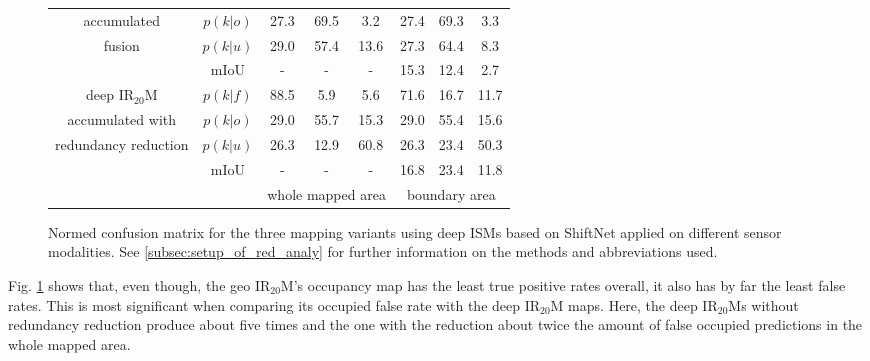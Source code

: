 \begin{figure}[H]
\begin{center}
\begin{tabular}{c|c|ccc|ccc}
			accumulated &$p(k|o)$ & \textcolor{myred}{27.3} & \textcolor{mygreen}{69.5} & 3.2& \textcolor{myred}{27.4} & \textcolor{mygreen}{69.3} & 3.3 \\
			fusion&$p(k|u)$ & 29.0 & 57.4 & 13.6& 27.3 & 64.4 & 8.3 \\
			& mIoU & - & - & - &15.3&12.4&2.7 \\
			\hline
			deep IR$_{20}$M &$p(k|f)$ & \textcolor{mygreen}{88.5} & \textcolor{myred}{5.9} & 5.6& \textcolor{mygreen}{71.6} & \textcolor{myred}{16.7} & 11.7 \\
			accumulated with &$p(k|o)$ & \textcolor{myred}{29.0} & \textcolor{mygreen}{55.7} & 15.3& \textcolor{myred}{29.0} & \textcolor{mygreen}{55.4} & 15.6 \\
			redundancy reduction &$p(k|u)$ & 26.3 & 12.9 & 60.8& 26.3 & 23.4 & 50.3 \\
			& mIoU & - & - & - &16.8&23.4&11.8 \\
			\hline
			& & \multicolumn{3}{c|}{\scriptsize{whole mapped area}} & \multicolumn{3}{c}{\scriptsize{boundary area}}
		\end{tabular}
		\caption{\label{tab:conf_mat_redunt_info}Normed confusion matrix for the three mapping variants using deep ISMs based on ShiftNet applied on different sensor modalities. See \ref{subsec:setup_of_red_analy} for further information on the methods and abbreviations used.}
	\end{center}
\end{figure}
Fig. \ref{tab:conf_mat_redunt_info} shows that, even though, the geo IR$_{20}$M's occupancy map has the least true positive rates overall, it also has by far the least false rates. This is most significant when comparing its occupied false rate with the deep IR$_{20}$M maps. Here, the deep IR$_{20}$Ms without redundancy reduction produce about five times and the one with the reduction about twice the amount of false occupied predictions in the whole mapped area.


